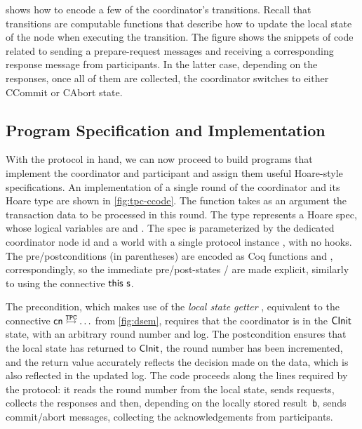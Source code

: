  shows how to encode a few of the
coordinator's transitions.
%
Recall that \disel transitions are computable functions that describe
how to update the local state of the node when executing the
transition.
%
The figure shows the snippets of \disel code related to sending a
prepare-request messages and receiving a corresponding response
message from participants.
%
In the latter case, depending on the responses, once all of them are
collected, the coordinator switches to either \textsf{CCommit} or
\textsf{CAbort} state.


\subsection{Program Specification and Implementation}
\label{sec:tpc-impl}

With the protocol in hand, we can now proceed to build programs that
implement the coordinator and participant and assign them useful
Hoare-style specifications.
%
An implementation of a single round of the coordinator and its Hoare
type are shown in \cref{fig:tpc-ccode}.
%
The function  takes as an argument the
transaction data to be processed in this round.
%
The type  represents a Hoare
spec, whose logical variables are  and . The spec is
parameterized by the dedicated coordinator node id  and a
world with a single protocol instance , with no hooks.
%
The pre/postconditions (in parentheses) are encoded as Coq functions
 and , correspondingly, so
the immediate pre/post-states / are made explicit,
similarly to using the connective $\mathsf{this}~{\mathsf{s}}$.

The precondition, which makes use of the \emph{local state getter}
, equivalent to the connective
$\mathsf{cn} \ppts{\mathtt{TPC}} \ldots$ from \cref{fig:dsem},
requires that the coordinator is in the $\mathsf{CInit}$ state, with an
arbitrary round number and log.
%
The postcondition ensures that the local state has returned to
$\mathsf{CInit}$, the round number has been incremented, and the return value
accurately reflects the decision made on the data, which is also
reflected in the updated log.
%
The code proceeds along the lines required by the protocol: it reads
the round number from the local state, sends requests, collects the
responses and then, depending on the locally stored result~\texttt{b},
sends commit/abort messages, collecting the acknowledgements from
participants.

